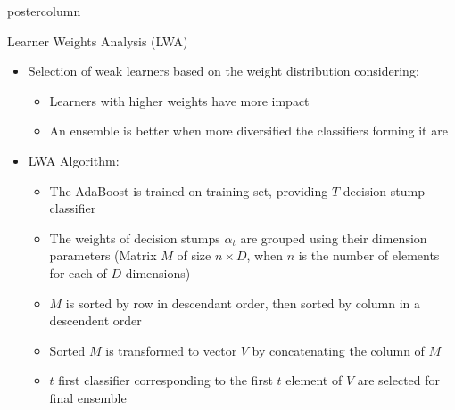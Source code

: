 \documentclass[final]{beamer}
\begin{document}
\begin{frame}
\begin{columns}
\begin{column}{.49\textwidth}
\begin{beamercolorbox}[center,wd=\textwidth]{postercolumn}
\begin{minipage}[T]{.95\textwidth}
{\begin{block}{Learner Weights Analysis (LWA)}
\begin{itemize}
\begin{center}
            		\end{center}
				\item Selection of weak learners based on the weight distribution considering: 
				\begin{itemize}
					\item Learners with higher weights have more impact
					\item An ensemble is better when more diversified the classifiers forming it are
				\end{itemize}
				\item LWA Algorithm: 
				\begin{itemize}
				\item The AdaBoost is trained on training set, providing $T$ decision stump classifier 
				\item The weights of decision stumps $\alpha_{t}$ are grouped using their dimension parameters (Matrix $M$ of size $n \times D$, when $n$ is the number of elements for each of $D$ dimensions)		 
				\item $M$ is sorted by row in descendant order, then sorted by column in a descendent order 
				\item Sorted $M$ is transformed to vector $V$ by concatenating the column of $M$
				\item $t$ first classifier corresponding to the first $t$ element of $V$ are selected for final ensemble 
			

\end{itemize}
\end{itemize}
\end{block}}
\end{minipage}
\end{beamercolorbox}
\end{column}
\end{columns}
\end{frame}
\end{document}
